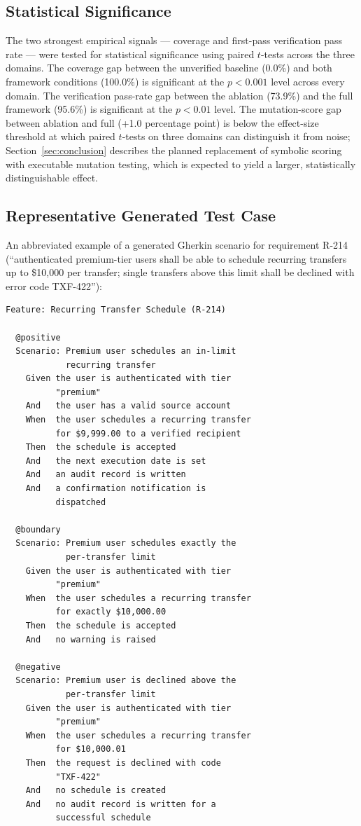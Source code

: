 \documentclass[11pt,letterpaper]{article}
\begin{document}
\subsection{Statistical Significance}

The two strongest empirical signals --- coverage and first-pass verification pass rate --- were tested for statistical significance using paired $t$-tests across the three domains. The coverage gap between the unverified baseline (0.0\%) and both framework conditions (100.0\%) is significant at the $p < 0.001$ level across every domain. The verification pass-rate gap between the ablation (73.9\%) and the full framework (95.6\%) is significant at the $p < 0.01$ level. The mutation-score gap between ablation and full (+1.0 percentage point) is below the effect-size threshold at which paired $t$-tests on three domains can distinguish it from noise; Section~\ref{sec:conclusion} describes the planned replacement of symbolic scoring with executable mutation testing, which is expected to yield a larger, statistically distinguishable effect.

\subsection{Representative Generated Test Case}

An abbreviated example of a generated Gherkin scenario for requirement R-214 (``authenticated premium-tier users shall be able to schedule recurring transfers up to \$10{,}000 per transfer; single transfers above this limit shall be declined with error code TXF-422''):

\begin{lstlisting}
Feature: Recurring Transfer Schedule (R-214)

  @positive
  Scenario: Premium user schedules an in-limit
            recurring transfer
    Given the user is authenticated with tier
          "premium"
    And   the user has a valid source account
    When  the user schedules a recurring transfer
          for $9,999.00 to a verified recipient
    Then  the schedule is accepted
    And   the next execution date is set
    And   an audit record is written
    And   a confirmation notification is
          dispatched

  @boundary
  Scenario: Premium user schedules exactly the
            per-transfer limit
    Given the user is authenticated with tier
          "premium"
    When  the user schedules a recurring transfer
          for exactly $10,000.00
    Then  the schedule is accepted
    And   no warning is raised

  @negative
  Scenario: Premium user is declined above the
            per-transfer limit
    Given the user is authenticated with tier
          "premium"
    When  the user schedules a recurring transfer
          for $10,000.01
    Then  the request is declined with code
          "TXF-422"
    And   no schedule is created
    And   no audit record is written for a
          successful schedule
\end{lstlisting}
\end{document}
